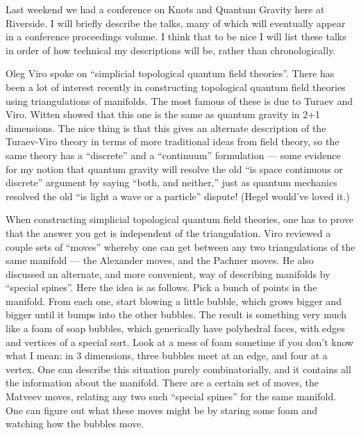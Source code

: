 \documentclass{article}
\begin{document}
Last weekend we had a conference on Knots and Quantum Gravity here at
Riverside. I will briefly describe the talks, many of which will
eventually appear in a conference proceedings volume. I think that to be
nice I will list these talks in order of how technical my descriptions
will be, rather than chronologically.

Oleg Viro spoke on ``simplicial topological quantum field theories''.
There has been a lot of interest recently in constructing topological
quantum field theories using triangulations of manifolds. The most
famous of these is due to Turaev and Viro. Witten showed that this one
is the same as quantum gravity in 2+1 dimensions. The nice thing is that
this gives an alternate description of the Turaev-Viro theory in terms
of more traditional ideas from field theory, so the same theory has a
``discrete'' and a ``continuum'' formulation --- some evidence for my
notion that quantum gravity will resolve the old ``is space continuous
or discrete'' argument by saying ``both, and neither,'' just as quantum
mechanics resolved the old ``is light a wave or a particle'' dispute!
(Hegel would've loved it.)

When constructing simplicial topological quantum field theories, one has
to prove that the answer you get is independent of the triangulation.
Viro reviewed a couple sets of ``moves'' whereby one can get between any
two triangulations of the same manifold --- the Alexander moves, and the
Pachner moves. He also discussed an alternate, and more convenient, way
of describing manifolds by ``special spines''. Here the idea is as
follows. Pick a bunch of points in the manifold. From each one, start
blowing a little bubble, which grows bigger and bigger until it bumps
into the other bubbles. The result is something very much like a foam of
soap bubbles, which generically have polyhedral faces, with edges and
vertices of a special sort. Look at a mess of foam sometime if you don't
know what I mean: in 3 dimensions, three bubbles meet at an edge, and
four at a vertex. One can describe this situation purely
combinatorially, and it contains all the information about the manifold.
There are a certain set of moves, the Matveev moves, relating any two
such ``special spines'' for the same manifold. One can figure out what
these moves might be by staring some foam and watching how the bubbles
move.
\end{document}
